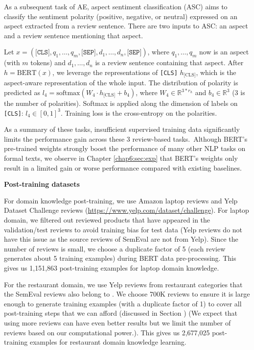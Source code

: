 As a subsequent task of AE, aspect sentiment classification (ASC) aims to classify the sentiment polarity (positive, negative, or neutral) expressed on an aspect extracted from a review sentence.
There are two inputs to ASC: an aspect and a review sentence mentioning that aspect.

Let $x=(\texttt{[CLS]}, q_1, \dots, q_m, \texttt{[SEP]}, d_1, \dots, d_n, \texttt{[SEP]})$, where $q_1, \dots, q_m$ now is an aspect (with $m$ tokens) and $d_1, \dots, d_n$ is a review sentence containing that aspect.
After $h=\text{BERT}(x)$, we leverage the representations of \texttt{[CLS]} $h_{\text{[CLS]}}$, which is the aspect-aware representation of the whole input.
The distribution of polarity is predicted as $l_4=\text{softmax}(W_4 \cdot h_{\text{[CLS]}} + b_4)$, where $W_4 \in \mathbb{R}^{3*r_h}$ and $b_4 \in \mathbb{R}^3$ (3 is the number of polarities). Softmax is applied along the dimension of labels on \texttt{[CLS]}: $l_4 \in [0, 1]^{3}$.
Training loss is the cross-entropy on the polarities.

As a summary of these tasks, insufficient supervised training data significantly limits the performance gain across these 3 review-based tasks.~Although BERT's pre-trained weights strongly boost the performance of many other NLP tasks on formal texts, we observe in Chapter \ref{chap6:sec:exp} that BERT's weights only result in a limited gain or worse performance compared with existing baselines.

\textbf{Post-training datasets}

For domain knowledge post-training, we use Amazon laptop reviews \cite{HeMcA16a} and Yelp Dataset Challenge reviews (\url{https://www.yelp.com/dataset/challenge}).
For laptop domain, we filtered out reviewed products that have appeared in the validation/test reviews to avoid training bias for test data (Yelp reviews do not have this issue as the source reviews of SemEval are not from Yelp). 
Since the number of reviews is small, we choose a duplicate factor of 5 (each review generates about 5 training examples) during BERT data pre-processing.
This gives us 
1,151,863 post-training examples for laptop domain knowledge.

For the restaurant domain, we use Yelp reviews from restaurant categories that the SemEval reviews also belong to \cite{xu_acl2018}.
We choose 700K reviews to ensure it is large enough to generate training examples (with a duplicate factor of 1) to cover all post-training steps that we can afford (discussed in Section 
) (We expect that using more reviews can have even better results but we limit the number of reviews based on our computational power.).
This gives us 2,677,025 post-training examples for restaurant domain knowledge learning.

